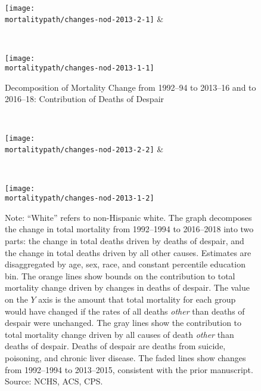 \documentclass[12pt,letterpaper]{article}
\begin{document}
\begin{figure}[H]
  \caption{Decomposition of Mortality Change from 1992--94 to 2013--16 and to 2016--18: \cnewline
    Contribution of Deaths of Despair}
  \label{fig:mort_causes}

  \begin{center}
     \\
  \end{center}
  \begin{center}
    \texttt{[image: \\mortalitypath/changes-nod-2013-2-1]} &
  \end{center}

  \begin{center}
     \\
  \end{center}
  \begin{center}
    \texttt{[image: \\mortalitypath/changes-nod-2013-1-1]} \\
  \end{center}
\end{figure}
\begin{figure}[H]
  \begin{center}
     \\
  \end{center}
  \begin{center}
    \texttt{[image: \\mortalitypath/changes-nod-2013-2-2]} &
  \end{center}
  \begin{center}
     \\
  \end{center}
  \begin{center}
    \texttt{[image: \\mortalitypath/changes-nod-2013-1-2]} \\
  \end{center}
\scriptsize{Note: ``White'' refers to non-Hispanic white. The graph decomposes the change in total mortality from 1992--1994 to 2016--2018 into two parts: the change in total deaths driven by deaths of despair, and the change in total deaths driven by all other causes. Estimates are disaggregated by age, sex, race, and constant percentile education bin. The orange lines show bounds on the contribution to total mortality change driven by changes in deaths of despair. The value on the $Y$ axis is the amount that total mortality for each group would have changed if the rates of all deaths \textit{other} than deaths of despair were unchanged. The gray lines show the contribution to total mortality change driven by all causes of death \textit{other} than deaths of despair. Deaths of despair are deaths from suicide, poisoning, and chronic liver disease. The faded lines show changes from 1992--1994 to 2013--2015, consistent with the prior manuscript. Source: NCHS, ACS, CPS.}
\end{figure}
\vspace{-1cm}
\end{document}
